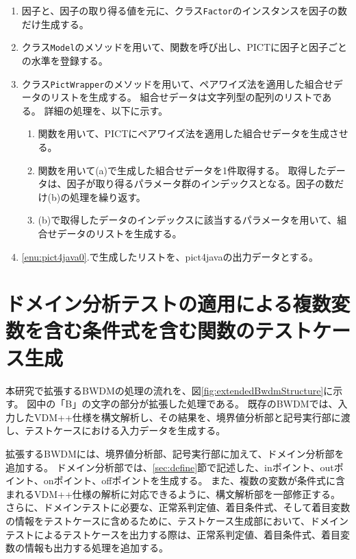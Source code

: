\documentclass[uplatex, report, a4j, 10pt]{jsbook}
\newcommand\ttt[1]{\texttt{#1}}
\begin{document}
\begin{enumerate}
  \item 因子と、因子の取り得る値を元に、クラス\ttt{Factor}のインスタンスを因子の数だけ生成する。
  \item クラス\ttt{Model}の\addFactor{}メソッドを用いて、\PictAddParameter{}関数を呼び出し、PICTに因子と因子ごとの水準を登録する。
  \item\label{enu:pict4java0} クラス\ttt{PictWrapper}の\generate{}メソッドを用いて、ペアワイズ法を適用した組合せデータのリストを生成する。
        組合せデータは文字列型の配列のリストである。
        詳細の処理を、以下に示す。
        \begin{enumerate}
          \item\label{enu:pict4java1} \PictGenerate{}関数を用いて、PICTにペアワイズ法を適用した組合せデータを生成させる。
          \item\label{enu:pict4java2} \PictGetNextResultRow{}関数を用いて(a)で生成した組合せデータを1件取得する。
                取得したデータは、因子が取り得るパラメータ群のインデックスとなる。因子の数だけ(b)の処理を繰り返す。
          \item (b)で取得したデータのインデックスに該当するパラメータを用いて、組合せデータのリストを生成する。
        \end{enumerate}
  \item \ref{enu:pict4java0}.で生成したリストを、pict4javaの出力データとする。
\end{enumerate}

\section{ドメイン分析テストの適用による複数変数を含む条件式を含む関数のテストケース生成}\label{sec:extendDomain}

本研究で拡張するBWDMの処理の流れを、図\ref{fig:extendedBwdmStructure}に示す。
図中の「B」の文字の部分が拡張した処理である。
既存のBWDMでは、入力したVDM++仕様を構文解析し、その結果を、境界値分析部と記号実行部に渡し、テストケースにおける入力データを生成する。

拡張するBWDMには、境界値分析部、記号実行部に加えて、ドメイン分析部を追加する。
ドメイン分析部では、\ref{sec:define}節で記述した、inポイント、outポイント、onポイント、offポイントを生成する。
また、複数の変数が条件式に含まれるVDM++仕様の解析に対応できるように、構文解析部を一部修正する。
さらに、ドメインテストに必要な、正常系判定値、着目条件式、そして着目変数の情報をテストケースに含めるために、テストケース生成部において、ドメインテストによるテストケースを出力する際は、正常系判定値、着目条件式、着目変数の情報も出力する処理を追加する。
\end{document}
